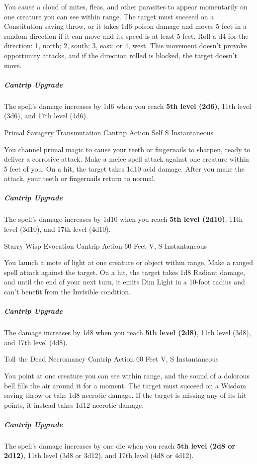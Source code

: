 \documentclass[letterpaper,openany,oneside,twocolumn]{book}
\begin{document}
You cause a cloud of mites, fleas, and other parasites to appear momentarily on one creature you can see within range. The target must succeed on a Constitution saving throw, or it takes 1d6 poison damage and moves 5 feet in a random direction if it can move and its speed is at least 5 feet. Roll a d4 for the direction: 1, north; 2, south; 3, east; or 4, west. This movement doesn't provoke opportunity attacks, and if the direction rolled is blocked, the target doesn't move.

\subparagraph*{Cantrip Upgrade} The spell's damage increases by 1d6 when you reach \textbf{5th level (2d6)}, 11th level (3d6), and 17th level (4d6).

\DndSpellHeader
  {Primal Savagery}
  {Transmutation Cantrip}
  {Action}
  {Self}
  {S}
  {Instantaneous}

You channel primal magic to cause your teeth or fingernails to sharpen, ready to deliver a corrosive attack. Make a melee spell attack against one creature within 5 feet of you. On a hit, the target takes 1d10 acid damage. After you make the attack, your teeth or fingernails return to normal.

\subparagraph*{Cantrip Upgrade} The spell's damage increases by 1d10 when you reach \textbf{5th level (2d10)}, 11th level (3d10), and 17th level (4d10).

\DndSpellHeader
  {Starry Wisp}
  {Evocation Cantrip}
  {Action}
  {60 Feet}
  {V, S}
  {Instantaneous}

You launch a mote of light at one creature or object within range. Make a ranged spell attack against the target. On a hit, the target takes 1d8 Radiant damage, and until the end of your next turn, it emits Dim Light in a 10-foot radius and can't benefit from the Invisible condition.

\subparagraph*{Cantrip Upgrade} The damage increases by 1d8 when you reach \textbf{5th level (2d8)}, 11th level (3d8), and 17th level (4d8).

\DndSpellHeader
  {Toll the Dead}
  {Necromancy Cantrip}
  {Action}
  {60 Feet}
  {V, S}
  {Instantaneous}

You point at one creature you can see within range, and the sound of a dolorous bell fills the air around it for a moment. The target must succeed on a Wisdom saving throw or take 1d8 necrotic damage. If the target is missing any of its hit points, it instead takes 1d12 necrotic damage.

\subparagraph*{Cantrip Upgrade} The spell's damage increases by one die when you reach \textbf{5th level (2d8 or 2d12)}, 11th level (3d8 or 3d12), and 17th level (4d8 or 4d12).
\end{document}
